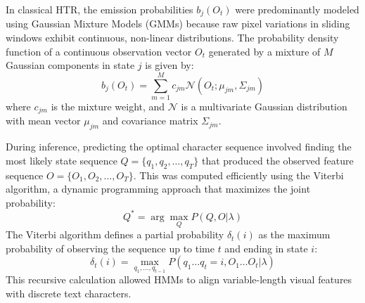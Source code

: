 In classical HTR, the emission probabilities $b_j(O_t)$ were predominantly modeled using Gaussian Mixture Models (GMMs) because raw pixel variations in sliding windows exhibit continuous, non-linear distributions. The probability density function of a continuous observation vector $O_t$ generated by a mixture of $M$ Gaussian components in state $j$ is given by:
\begin{equation}
    b_j(O_t) = \sum_{m=1}^{M} c_{jm} \mathcal{N}(O_t; \mu_{jm}, \Sigma_{jm})
\end{equation}
where $c_{jm}$ is the mixture weight, and $\mathcal{N}$ is a multivariate Gaussian distribution with mean vector $\mu_{jm}$ and covariance matrix $\Sigma_{jm}$. 

During inference, predicting the optimal character sequence involved finding the most likely state sequence $Q = \{q_1, q_2, \dots, q_T\}$ that produced the observed feature sequence $O = \{O_1, O_2, \dots, O_T\}$. This was computed efficiently using the Viterbi algorithm, a dynamic programming approach that maximizes the joint probability:
\begin{equation}
    Q^* = \arg\max_{Q} P(Q, O | \lambda)
\end{equation}
The Viterbi algorithm defines a partial probability $\delta_t(i)$ as the maximum probability of observing the sequence up to time $t$ and ending in state $i$:
\begin{equation}
    \delta_t(i) = \max_{q_1, \dots, q_{t-1}} P(q_1 \dots q_t = i, O_1 \dots O_t | \lambda)
\end{equation}
This recursive calculation allowed HMMs to align variable-length visual features with discrete text characters.


